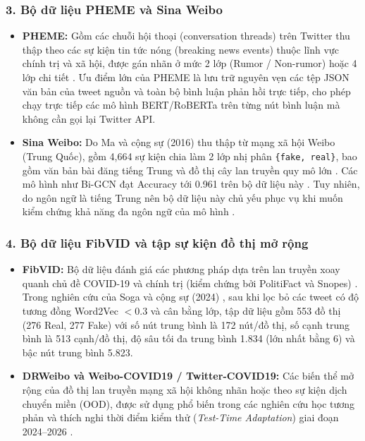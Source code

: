 \documentclass[11pt,a4paper]{extreport}
\begin{document}
\subsubsection{3. Bộ dữ liệu PHEME và Sina Weibo}
\begin{itemize}
    \item \textbf{PHEME:} Gồm các chuỗi hội thoại (conversation threads) trên Twitter thu thập theo các sự kiện tin tức nóng (breaking news events) thuộc lĩnh vực chính trị và xã hội, được gán nhãn ở mức 2 lớp (Rumor / Non-rumor) hoặc 4 lớp chi tiết \cite{noauthor_fake_2023, noauthor_disinformation_2024, noauthor_detection_2025}. Ưu điểm lớn của PHEME là lưu trữ nguyên vẹn các tệp JSON văn bản của tweet nguồn và toàn bộ bình luận phản hồi trực tiếp, cho phép chạy trực tiếp các mô hình BERT/RoBERTa trên từng nút bình luận mà không cần gọi lại Twitter API.
    \item \textbf{Sina Weibo:} Do Ma và cộng sự (2016) thu thập từ mạng xã hội Weibo (Trung Quốc), gồm 4,664 sự kiện chia làm 2 lớp nhị phân \texttt{\{fake, real\}}, bao gồm văn bản bài đăng tiếng Trung và đồ thị cây lan truyền quy mô lớn \cite{noauthor_disinformation_2024, noauthor_detection_2025}. Các mô hình như Bi-GCN đạt Accuracy tới 0.961 trên bộ dữ liệu này \cite{noauthor_detection_2025}. Tuy nhiên, do ngôn ngữ là tiếng Trung nên bộ dữ liệu này chủ yếu phục vụ khi muốn kiểm chứng khả năng đa ngôn ngữ của mô hình \cite{noauthor_semantic_2025-1, lin_unified_2023}.
\end{itemize}

\subsubsection{4. Bộ dữ liệu FibVID và tập sự kiện đồ thị mở rộng}
\begin{itemize}
    \item \textbf{FibVID:} Bộ dữ liệu đánh giá các phương pháp dựa trên lan truyền xoay quanh chủ đề COVID-19 và chính trị (kiểm chứng bởi PolitiFact và Snopes) \cite{noauthor_exploiting_2024}. Trong nghiên cứu của Soga và cộng sự (2024) \cite{noauthor_exploiting_2024}, sau khi lọc bỏ các tweet có độ tương đồng Word2Vec $<0.3$ và cân bằng lớp, tập dữ liệu gồm 553 đồ thị (276 Real, 277 Fake) với số nút trung bình là 172 nút/đồ thị, số cạnh trung bình là 513 cạnh/đồ thị, độ sâu tối đa trung bình 1.834 (lớn nhất bằng 6) và bậc nút trung bình 5.823.
    \item \textbf{DRWeibo và Weibo-COVID19 / Twitter-COVID19:} Các biến thể mở rộng của đồ thị lan truyền mạng xã hội không nhãn hoặc theo sự kiện dịch chuyển miền (OOD), được sử dụng phổ biến trong các nghiên cứu học tương phản và thích nghi thời điểm kiểm thử (\textit{Test-Time Adaptation}) giai đoạn 2024--2026 \cite{cui_avoiding_2026, cui_graph_2025, tao_out--distribution_2024}.
\end{itemize}
\end{document}
